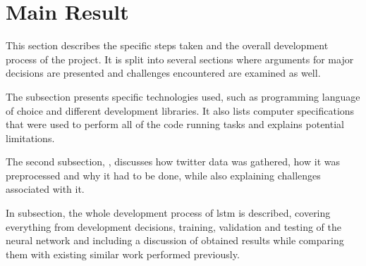 \section{Main Result}
    This section describes the specific steps taken and the overall development process of the project. It is split into several sections where arguments for major decisions are presented and challenges encountered are examined as well.
    
    The  subsection presents specific technologies used, such as programming language of choice and different development libraries. It also lists computer specifications that were used to perform all of the code running tasks and explains potential limitations.
    
    The second subsection, , discusses how twitter data was gathered, how it was preprocessed and why it had to be done, while also explaining challenges associated with it.
    
    In  subsection, the whole development process of \gls{lstm} is described, covering everything from development decisions, training, validation and testing of the neural network and including a discussion of obtained results while comparing them with existing similar work performed previously. 

